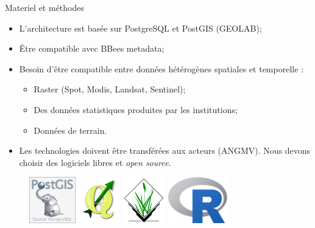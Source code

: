 \documentclass[newPxFont]{beamer}
\begin{document}
\begin{frame}[c]{Materiel et méthodes}
\vspace{-1cm}
\begin{itemize}
	\item L'architecture est basée sur PostgreSQL et PostGIS (GEOLAB);
	\item \^Etre compatible avec BBees metadata;
	\item Besoin d'être compatible entre données hétérogènes spatiales et temporelle :
	\begin{itemize}
		\item Raster (Spot, Modis, Landsat, Sentinel);
		\item Des données statistiques produites par les institutions;
		\item Données de terrain.
	\end{itemize}
	\item Les technologies doivent être transférées aux acteurs (ANGMV). Nous devons choisir des logiciels libres et \textit{open source}.
\end{itemize}
\begin{figure}
	\centering
	\includegraphics[height=20mm]{img/PostGIS_logo}
	\includegraphics[height=20mm]{img/QGis_Logo}
	\includegraphics[height=20mm]{img/GrassGIS_banner}
	\includegraphics[height=20mm]{img/Rlogo}
\end{figure}
\end{frame}
\end{document}
